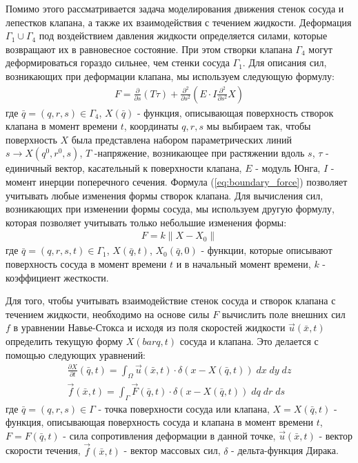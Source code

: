 Помимо этого рассматривается задача моделирования движения стенок
сосуда и лепестков клапана, а также их взаимодействия с течением жидкости.
Деформация $\Gamma_1 \cup \Gamma_4$ под воздействием давления жидкости
определяется силами, которые возвращают их в равновесное состояние. При этом
створки клапана $\Gamma_4$ могут деформироваться гораздо сильнее, чем стенки
сосуда $\Gamma_1$. Для описания сил, возникающих при деформации клапана, мы
используем следующую формулу:
\begin{gather}
    \label{eq:boundary_force}
    F = \frac{\partial}{\partial s} (T \tau) + \frac{\partial^2}{\partial s^2} (E \cdot I \frac{\partial^2}{\partial s^2} X)
\end{gather}
где $\bar{q}=(q, r, s) \in \Gamma_4$, $X(\bar{q})$ - функция, описывающая
поверхность створок клапана в момент времени $t$, координаты $q, r, s$ мы
выбираем так, чтобы поверхность $X$ была представлена набором параметрических
линий $s \rightarrow X(q^0, r^0, s)$, $T$ -напряжение, возникающее при
растяжении вдоль $s$, $\tau$ - единичный вектор, касательный к поверхности
клапана, $E$ - модуль Юнга, $I$ - момент инерции поперечного сечения. Формула
(\ref{eq:boundary_force}) позволяет учитывать любые изменения формы створок
клапана.  Для вычисления сил, возникающих при изменении формы сосуда, мы
используем другую формулу, которая позволяет учитывать только небольшие
изменения формы:
\begin{gather}
    \label{eq:boundary_force_simple}
    F = k \|X - X_0\|
\end{gather}
где $\bar{q} = (q, r, s, t) \in \Gamma_1$, $X(\bar{q}, t)$, $X_0(\bar{q}, 0)$ -
функции, которые описывают поверхность сосуда в момент времени $t$ и в
начальный момент времени, $k$ - коэффициент жесткости.

Для того, чтобы учитывать взаимодействие стенок сосуда и створок клапана с
течением жидкости, необходимо на основе силы $F$ вычислить поле внешних сил $f$
в уравнении Навье-Стокса и исходя из поля скоростей жидкости $\vec{u}(\bar{x},
t)$ определить текущую форму $X(bar{q}, t)$ сосуда и клапана. Это делается с
помощью следующих уравнений:
\begin{gather}
    \label{eq:interaction:velocity}
    \frac{\partial X}{\partial t}(\bar{q}, t) = \int_{\Omega} \vec{u}(\bar{x}, t) \cdot \delta (x - X(\bar{q}, t))\; dx\; dy\; dz\\
    \label{eq:interaction:force}
    \vec{f}(\bar{x}, t) = \int_{\Gamma} \vec{F}(\bar{q}, t) \cdot \delta (x - X(\bar{q}, t))\; dq\; dr\; ds
\end{gather}
где $\bar{q} = (q, r, s) \in \Gamma$ - точка поверхности сосуда или клапана, $X
= X(\bar{q}, t)$ - функция, описывающая поверхность сосуда и клапана в момент
времени $t$, $F = F(\bar{q}, t)$ - сила сопротивления деформации в данной
точке, $\vec{u}(\bar{x}, t)$ - вектор скорости течения, $\vec{f}(\bar{x}, t)$ -
вектор массовых сил, $\delta$ - дельта-функция Дирака.

